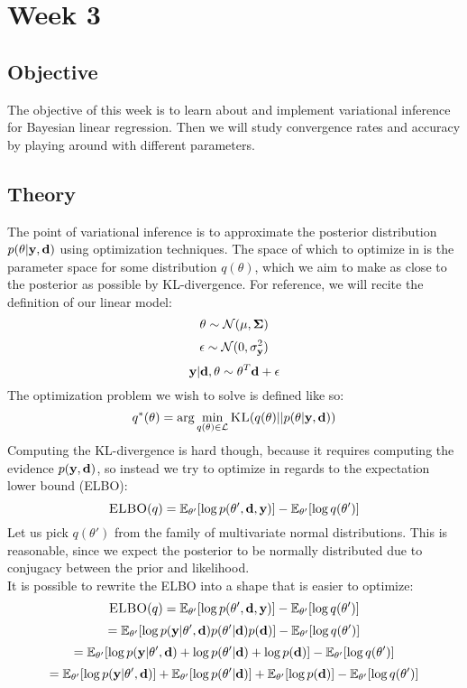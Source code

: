 \section{Week 3}
\subsection{Objective}
The objective of this week is to learn about and implement variational inference for Bayesian linear regression. 
Then we will study convergence rates and accuracy by playing around with different parameters.
\subsection{Theory}
The point of variational inference is to approximate the posterior distribution $p(\theta | \mathbf{y}, \mathbf{d})$ using optimization techniques.
The space of which to optimize in is the parameter space for some distribution $q(\theta)$, which we aim to make as close to the posterior as possible by KL-divergence.
For reference, we will recite the definition of our linear model:
$$\theta \sim \mathcal{N}(\mathbf{\mu}, \mathbf{\Sigma})$$
$$\epsilon \sim \mathcal{N}(0, \sigma^2_{\mathbf{y}})$$
$$\mathbf{y} | \mathbf{d}, \theta \sim \theta^T \mathbf{d} + \epsilon$$
The optimization problem we wish to solve is defined like so:
$$q^*(\theta) = \arg \min_{q(\theta) \in \mathcal{L}} \textsc{KL}(q(\theta) || p(\theta | \mathbf{y}, \mathbf{d}))$$
Computing the KL-divergence is hard though, because it requires computing the evidence $p(\mathbf{y}, \mathbf{d})$, so instead we try to optimize in regards to the expectation lower bound (ELBO):
$$\textsc{ELBO}(q) = \mathbb{E}_{\theta'}[\log p(\theta', \mathbf{d}, \mathbf{y})] - \mathbb{E}_{\theta'}[\log q(\theta')]$$
Let us pick $q(\theta')$ from the family of multivariate normal distributions. This is reasonable, since we expect the posterior to be normally distributed due to conjugacy between the prior and likelihood.\\
It is possible to rewrite the ELBO into a shape that is easier to optimize:
$$\textsc{ELBO}(q) = \mathbb{E}_{\theta'}[\log p(\theta', \mathbf{d}, \mathbf{y})] - \mathbb{E}_{\theta'}[\log q(\theta')]$$
$$ = \mathbb{E}_{\theta'}[\log p(\mathbf{y} | \theta', \mathbf{d}) p(\theta' | \mathbf{d})p(\mathbf{d})] - \mathbb{E}_{\theta'}[\log q(\theta')]$$
$$ = \mathbb{E}_{\theta'}[\log p(\mathbf{y} | \theta', \mathbf{d}) + \log p(\theta' | \mathbf{d}) + \log p(\mathbf{d})] - \mathbb{E}_{\theta'}[\log q(\theta')]$$
$$ = \mathbb{E}_{\theta'}[\log p(\mathbf{y} | \theta', \mathbf{d})] + \mathbb{E}_{\theta'}[\log p(\theta' | \mathbf{d})] + \mathbb{E}_{\theta'}[\log p(\mathbf{d})] - \mathbb{E}_{\theta'}[\log q(\theta')]$$
